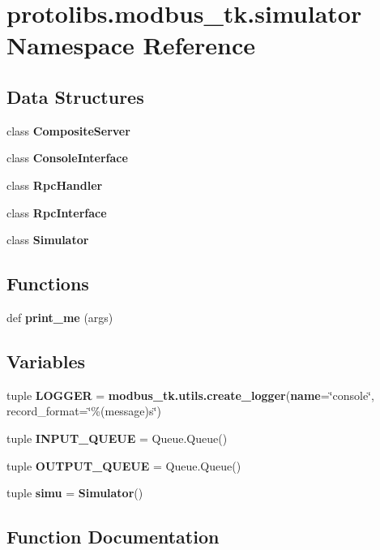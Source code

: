 \section{protolibs.\+modbus\+\_\+tk.\+simulator Namespace Reference}
\label{namespaceprotolibs_1_1modbus__tk_1_1simulator}
\subsection*{Data Structures}
\begin{DoxyCompactItemize}
\item 
class {\bf Composite\+Server}
\item 
class {\bf Console\+Interface}
\item 
class {\bf Rpc\+Handler}
\item 
class {\bf Rpc\+Interface}
\item 
class {\bf Simulator}
\end{DoxyCompactItemize}
\subsection*{Functions}
\begin{DoxyCompactItemize}
\item 
def {\bf print\+\_\+me} (args)
\end{DoxyCompactItemize}
\subsection*{Variables}
\begin{DoxyCompactItemize}
\item 
tuple {\bf L\+O\+G\+G\+E\+R} = {\bf modbus\+\_\+tk.\+utils.\+create\+\_\+logger}({\bf name}=\char`\"{}console\char`\"{}, record\+\_\+format=\char`\"{}\%(message)s\char`\"{})
\item 
tuple {\bf I\+N\+P\+U\+T\+\_\+\+Q\+U\+E\+U\+E} = Queue.\+Queue()
\item 
tuple {\bf O\+U\+T\+P\+U\+T\+\_\+\+Q\+U\+E\+U\+E} = Queue.\+Queue()
\item 
tuple {\bf simu} = {\bf Simulator}()
\end{DoxyCompactItemize}


\subsection{Function Documentation}
